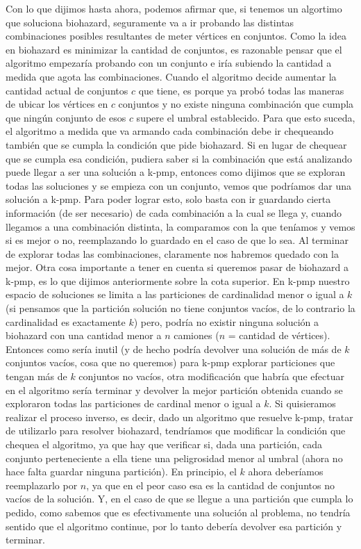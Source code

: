 \documentclass[a4paper]{article}
\begin{document}
\newline Con lo que dijimos hasta ahora, podemos afirmar que, si tenemos un algortimo que soluciona biohazard, seguramente va a ir probando las distintas combinaciones posibles resultantes de meter vértices en conjuntos. Como la idea en biohazard es minimizar la cantidad de conjuntos, es razonable pensar que el algoritmo empezaría probando con un conjunto e iría subiendo la cantidad a medida que agota las combinaciones. Cuando el algoritmo decide aumentar la cantidad actual de conjuntos $c$ que tiene, es porque ya probó todas las maneras de ubicar los vértices en $c$ conjuntos y no existe ninguna combinación que cumpla que ningún conjunto de esos $c$ supere el umbral establecido. Para que esto suceda, el algoritmo a medida que va armando cada combinación debe ir chequeando también que se cumpla la condición que pide biohazard. Si en lugar de chequear que se cumpla esa condición, pudiera saber si la combinación que está analizando puede llegar a ser una solución a k-pmp, entonces como dijimos que se exploran todas las soluciones y se empieza con un conjunto, vemos que podríamos dar una solución a k-pmp. Para poder lograr esto, solo basta con ir guardando cierta información (de ser necesario) de cada combinación a la cual se llega y, cuando llegamos a una combinación distinta, la comparamos con la que teníamos y vemos si es mejor o no, reemplazando lo guardado en el caso de que lo sea. Al terminar de explorar todas las combinaciones, claramente nos habremos quedado con la mejor. Otra cosa importante a tener en cuenta si queremos pasar de biohazard a k-pmp, es lo que dijimos anteriormente sobre la cota superior. En k-pmp nuestro espacio de soluciones se limita a las particiones de cardinalidad menor o igual a $k$ (si pensamos que la partición solución no tiene conjuntos vacíos, de lo contrario la cardinalidad es exactamente $k$) pero, podría no existir ninguna solución a biohazard con una cantidad menor a $n$ camiones ($n$ = cantidad de vértices). Entonces como sería inutil (y de hecho podría devolver una solución de más de $k$ conjuntos vacíos, cosa que no queremos) para k-pmp explorar particiones que tengan más de $k$ conjuntos no vacíos, otra modificación que habría que efectuar en el algoritmo sería terminar y devolver la mejor partición obtenida cuando se exploraron todas las particiones de cardinal menor o igual a $k$.
\newline Si quisieramos realizar el proceso inverso, es decir, dado un algoritmo que resuelve k-pmp, tratar de utilizarlo para resolver biohazard, tendríamos que modificar la condición que chequea el algoritmo, ya que hay que verificar si, dada una partición, cada conjunto perteneciente a ella tiene una peligrosidad menor al umbral (ahora no hace falta guardar ninguna partición). En principio, el $k$ ahora deberíamos reemplazarlo por $n$, ya que en el peor caso esa es la cantidad de conjuntos no vacíos de la solución. Y, en el caso de que se llegue a una partición que cumpla lo pedido, como sabemos que es efectivamente una solución al problema, no tendría sentido que el algoritmo continue, por lo tanto debería devolver esa partición y terminar.
\end{document}
